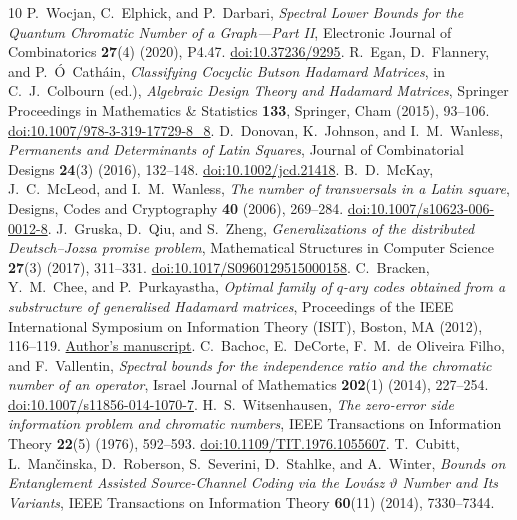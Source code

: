 \documentclass[11pt,a4paper]{article}
\numberwithin{equation}{section}
\numberwithin{figure}{section}
\numberwithin{table}{section}
\numberwithin{footnote}{section}
\theoremstyle{informal}\newtheorem*{informaltheorem}{Informal theorem}
\theoremstyle{definition}\newtheorem{example}{Example}[section]
\theoremstyle{remark}\newtheorem{remark}[theorem]{Remark}
\begin{document}
\begin{thebibliography}{10}
P.~Wocjan, C.~Elphick, and P.~Darbari,
\emph{Spectral Lower Bounds for the Quantum Chromatic Number of a
Graph---Part II},
Electronic Journal of Combinatorics \textbf{27}(4) (2020), P4.47.
\href{https://doi.org/10.37236/9295}{doi:10.37236/9295}.
R.~Egan, D.~Flannery, and P.~\'O~Cath\'ain,
\emph{Classifying Cocyclic Butson Hadamard Matrices},
in C.~J.~Colbourn (ed.), \emph{Algebraic Design Theory and Hadamard
Matrices}, Springer Proceedings in Mathematics \& Statistics
\textbf{133}, Springer, Cham (2015), 93--106.
\href{https://doi.org/10.1007/978-3-319-17729-8_8}{doi:10.1007/978-3-319-17729-8\_8}.
D.~Donovan, K.~Johnson, and I.~M.~Wanless,
\emph{Permanents and Determinants of Latin Squares},
Journal of Combinatorial Designs \textbf{24}(3) (2016), 132--148.
\href{https://doi.org/10.1002/jcd.21418}{doi:10.1002/jcd.21418}.
B.~D.~McKay, J.~C.~McLeod, and I.~M.~Wanless,
\emph{The number of transversals in a Latin square},
Designs, Codes and Cryptography \textbf{40} (2006), 269--284.
\href{https://doi.org/10.1007/s10623-006-0012-8}{doi:10.1007/s10623-006-0012-8}.
J.~Gruska, D.~Qiu, and S.~Zheng,
\emph{Generalizations of the distributed Deutsch--Jozsa promise problem},
Mathematical Structures in Computer Science \textbf{27}(3) (2017), 311--331.
\href{https://doi.org/10.1017/S0960129515000158}{doi:10.1017/S0960129515000158}.
C.~Bracken, Y.~M.~Chee, and P.~Purkayastha,
\emph{Optimal family of \(q\)-ary codes obtained from a substructure
of generalised Hadamard matrices},
Proceedings of the IEEE International Symposium on Information Theory
(ISIT), Boston, MA (2012), 116--119.
\href{https://ppurka.github.io/files/BCP-hadamard-ISIT2012.pdf}{Author's manuscript}.
C.~Bachoc, E.~DeCorte, F.~M.~de Oliveira Filho, and F.~Vallentin,
\emph{Spectral bounds for the independence ratio and the chromatic
number of an operator},
Israel Journal of Mathematics \textbf{202}(1) (2014), 227--254.
\href{https://doi.org/10.1007/s11856-014-1070-7}{doi:10.1007/s11856-014-1070-7}.
H.~S.~Witsenhausen,
\emph{The zero-error side information problem and chromatic numbers},
IEEE Transactions on Information Theory \textbf{22}(5) (1976), 592--593.
\href{https://doi.org/10.1109/TIT.1976.1055607}{doi:10.1109/TIT.1976.1055607}.
T.~Cubitt, L.~Man\v{c}inska, D.~Roberson, S.~Severini, D.~Stahlke,
and A.~Winter,
\emph{Bounds on Entanglement Assisted Source-Channel Coding via the
Lov\'asz \(\vartheta\) Number and Its Variants},
IEEE Transactions on Information Theory \textbf{60}(11) (2014), 7330--7344.

\end{thebibliography}
\end{document}
